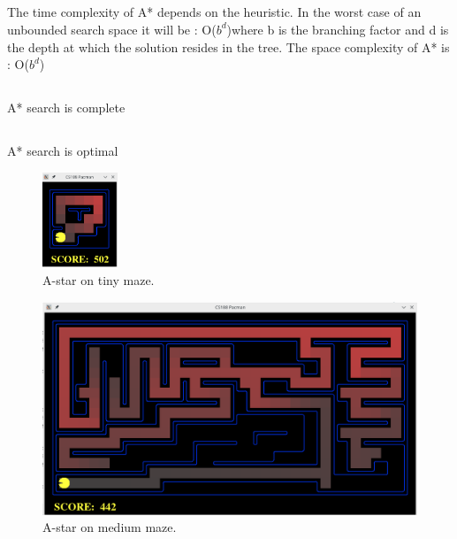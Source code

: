 \documentclass[
10pt, %
a4paper, %
oneside, %
headinclude,footinclude, %
BCOR5mm, %
]{scrartcl}
\begin{document}
\subsection*{}
The time complexity of A* depends on the heuristic. In the worst case of an unbounded search space it will be : O($b^d$)\newline where b is the branching factor and d is the depth at which the solution resides in the tree.
The space complexity of A* is : O($b^d$)
\subsection*{}
A* search is complete 
\subsection*{}
A* search is optimal



\begin{figure}[h!]
	\centering
	\includegraphics[width=0.20\textwidth]{images/fig_10_tinymaze_astar.png}
	\caption{ A-star on tiny maze.}
	\label{fig:fig_10_tinymaze_astar}
\end{figure}

\begin{figure}[h!]
	\centering
	\includegraphics[width=.6\textwidth]{images/fig_11_mediummaze_astar.png}
	\caption{ A-star on medium maze.}
	\label{fig:fig_11_mediummaze_astar}
\end{figure}
\end{document}
